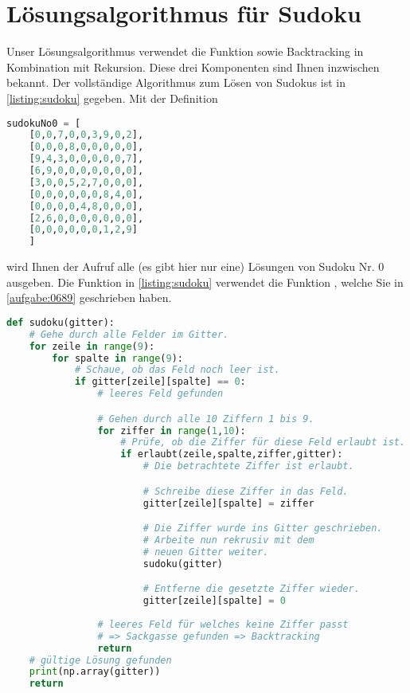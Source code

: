 \clearpage


\section{Lösungsalgorithmus für Sudoku}
Unser Lösungsalgorithmus verwendet die Funktion  sowie Backtracking in Kombination mit Rekursion. Diese drei Komponenten sind Ihnen inzwischen bekannt. Der vollständige Algorithmus zum Lösen von Sudokus ist in \cref{listing:sudoku} gegeben. Mit der Definition
\begin{lstlisting}[language=Python,caption=Abspeichern von Sudoku-Gittern in Python,numbers=none]
  sudokuNo0 = [
    [0,0,7,0,0,3,9,0,2],
    [0,0,0,8,0,0,0,0,0],
    [9,4,3,0,0,0,0,0,7],
    [6,9,0,0,0,0,0,0,0],
    [3,0,0,5,2,7,0,0,0],
    [0,0,0,0,0,0,8,4,0],
    [0,0,0,0,4,8,0,0,0],
    [2,6,0,0,0,0,0,0,0],
    [0,0,0,0,0,0,1,2,9]
    ]
\end{lstlisting}
wird Ihnen der Aufruf  alle (es gibt hier nur eine) Lösungen von Sudoku Nr. 0 ausgeben. Die Funktion in \cref{listing:sudoku} verwendet die Funktion , welche Sie in \cref{aufgabe:0689} geschrieben haben.

\lstset{style=mystyle}
\begin{lstlisting}[language=Python,caption=Implementation der Funktion \pythoninline{sudoku},label=listing:sudoku]
def sudoku(gitter):
	# Gehe durch alle Felder im Gitter.
	for zeile in range(9):
		for spalte in range(9):
			# Schaue, ob das Feld noch leer ist.
			if gitter[zeile][spalte] == 0:
				# leeres Feld gefunden

				# Gehen durch alle 10 Ziffern 1 bis 9.
				for ziffer in range(1,10):
					# Prüfe, ob die Ziffer für diese Feld erlaubt ist.
					if erlaubt(zeile,spalte,ziffer,gitter):
						# Die betrachtete Ziffer ist erlaubt.

						# Schreibe diese Ziffer in das Feld.
						gitter[zeile][spalte] = ziffer

						# Die Ziffer wurde ins Gitter geschrieben.
						# Arbeite nun rekrusiv mit dem
						# neuen Gitter weiter.
						sudoku(gitter)

						# Entferne die gesetzte Ziffer wieder.
						gitter[zeile][spalte] = 0
						
				# leeres Feld für welches keine Ziffer passt
				# => Sackgasse gefunden => Backtracking
				return
	# gültige Lösung gefunden
	print(np.array(gitter))
	return
\end{lstlisting} 

